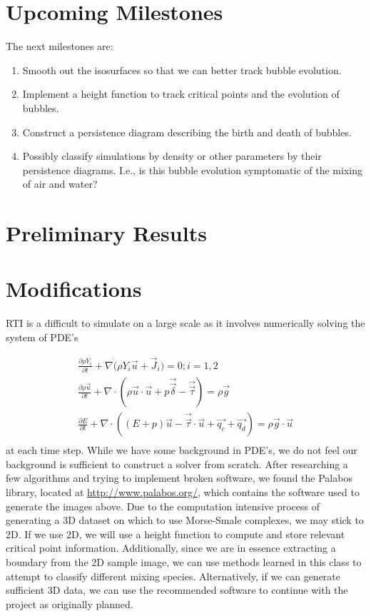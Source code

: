 \documentclass[12pt, fullpage,letterpaper]{article}
\begin{document}
	
	\section*{\normalfont Upcoming Milestones} The next milestones are:
	\begin{enumerate}
		\item Smooth out the isosurfaces so that we can better track bubble evolution.
		\item Implement a height function to track critical points and the evolution of bubbles.
		\item Construct a persistence diagram describing the birth and death of bubbles.
		\item Possibly classify simulations by density or other parameters by their persistence diagrams. I.e., is this bubble evolution symptomatic of the mixing of air and water?
	\end{enumerate} 

	\section*{\normalfont Preliminary Results}
	
	\section*{\normalfont Modifications} RTI is a difficult to simulate on a large scale as it involves numerically solving the system of PDE's
	
	\begin{gather*}
		\frac{\partial \rho Y_i}{\partial t} + \nabla \dot (\rho Y_i \vec{u} + \vec{J}_i) = 0; i = 1, 2 \\
		\frac{\partial \rho \vec{u}}{\partial t} + \nabla \cdot (\rho \vec{u} \cdot \vec{u} + p \vec{\vec{\delta}} - \vec{\vec{\tau}}) = \rho \vec{g} \\
		\frac{\partial E}{\partial t} + \nabla \cdot ((E + p)\vec{u} -\vec{\vec{\tau}}\cdot \vec{u} + \vec{q_c} + \vec{q_d} ) = \rho \vec{g} \cdot \vec{u} \\
	\end{gather*} 
	at each time step. While we have some background in PDE's, we do not feel our background is sufficient to construct a solver from scratch. After researching a few algorithms and trying to implement broken software, we found the Palabos library, located at \url{http://www.palabos.org/}, which contains the software used to generate the images above. Due to the computation intensive process of generating a 3D dataset on which to use Morse-Smale complexes, we may stick to 2D. If we use 2D, we will use a height function to compute and store relevant critical point information. Additionally, since we are in essence extracting a boundary from the 2D sample image, we can use methods learned in this class to attempt to classify different mixing species. Alternatively, if we can generate sufficient 3D data, we can use the recommended software to continue with the project as originally planned.
\end{document}
